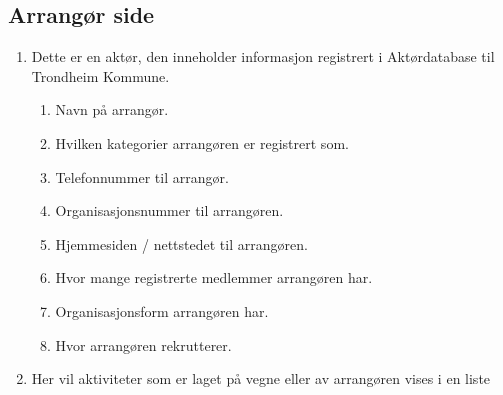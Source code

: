 \subsection{Arrangør side}
\begin{center}
\end{center}
\begin{enumerate}
    \item Dette er en aktør, den inneholder informasjon registrert i Aktørdatabase til Trondheim Kommune. 
    \begin{enumerate}
        \item Navn på arrangør. 
        \item Hvilken kategorier arrangøren er registrert som. 
        \item Telefonnummer til arrangør.
        \item Organisasjonsnummer til arrangøren.
        \item Hjemmesiden / nettstedet til arrangøren.
        \item Hvor mange registrerte medlemmer arrangøren har. 
        \item Organisasjonsform arrangøren har.
        \item Hvor arrangøren rekrutterer.
    \end{enumerate}
    \item Her vil aktiviteter som er laget på vegne eller av arrangøren vises i en liste
\end{enumerate}




\cleardoublepage